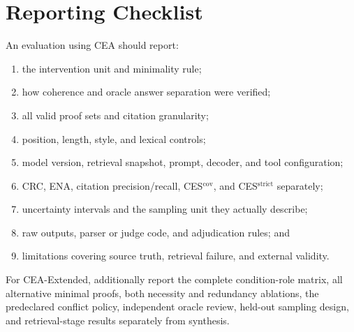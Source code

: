 \documentclass[10pt,twocolumn]{article}
\newcommand{\method}{\textsc{CEA}}
\begin{document}
\section{Reporting Checklist}

An evaluation using \method{} should report:
\begin{enumerate}[leftmargin=*,itemsep=1pt,topsep=3pt]
    \item the intervention unit and minimality rule;
    \item how coherence and oracle answer separation were verified;
    \item all valid proof sets and citation granularity;
    \item position, length, style, and lexical controls;
    \item model version, retrieval snapshot, prompt, decoder, and tool configuration;
    \item CRC, ENA, citation precision/recall, CES$^{\mathrm{cov}}$, and CES$^{\mathrm{strict}}$ separately;
    \item uncertainty intervals and the sampling unit they actually describe;
    \item raw outputs, parser or judge code, and adjudication rules; and
    \item limitations covering source truth, retrieval failure, and external validity.
\end{enumerate}

For CEA-Extended, additionally report the complete condition-role matrix,
all alternative minimal proofs, both necessity and redundancy ablations,
the predeclared conflict policy, independent oracle review, held-out
sampling design, and retrieval-stage results separately from synthesis.

\begingroup
\scriptsize
\setlength{\bibsep}{0pt}


\endgroup
\end{document}

